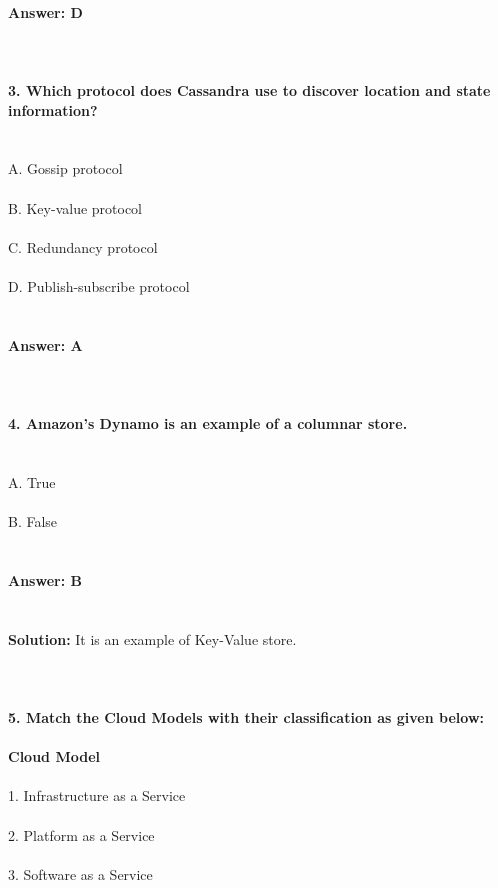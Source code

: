 \documentclass[prl,twocolumn,showpacs,preprintnumbers,superscriptaddress]{revtex4}
\theoremstyle{plain}
\theoremstyle{definition}
\begin{document}
\begin{widetext}
\\
\textbf{Answer: D}
\\
\\
\\
\\
\textbf{3. Which protocol does Cassandra use to discover location and state information?}
\\
\\
\\
A. Gossip protocol
\\
\\
B. Key-value protocol
\\
\\
C. Redundancy protocol
\\
\\
D. Publish-subscribe protocol
\\
\\
\\
\textbf{Answer: A}
\\
\\
\\
\\
\textbf{4. Amazon's Dynamo is an example of a columnar store.}
\\
\\
\\
A. True
\\
\\
B. False
\\
\\
\\
\textbf{Answer: B}
\\
\\
\\
\textbf{Solution:} It is an example of Key-Value store.
\\
\\
\\
\\
\newpage
\noindent \textbf{5. Match the Cloud Models with their classification as given below:}
\\
\\
\textbf{Cloud Model}
\\
\\
1. Infrastructure as a Service
\\
\\
2. Platform as a Service
\\
\\
3. Software as a Service
\\
\\


\end{widetext}
\end{document}
